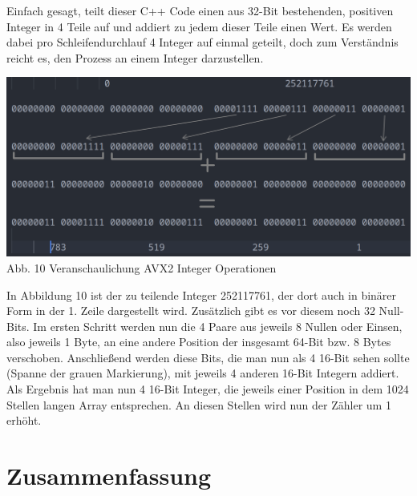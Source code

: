 \documentclass[11pt,a4paper]{article}
\begin{document}
Einfach gesagt, teilt dieser C++ Code einen aus 32-Bit bestehenden, positiven Integer in 4 Teile auf und addiert
zu jedem dieser Teile einen Wert. Es werden dabei pro Schleifendurchlauf 4 Integer auf einmal geteilt, doch zum Verständnis reicht es,
den Prozess an einem Integer darzustellen.

\begin{center}
    \includegraphics[width=1\textwidth]{./diagramme/matplotlib/avx2explanationfull.png}
    Abb. 10 Veranschaulichung AVX2 Integer Operationen
\end{center}

In Abbildung 10 ist der zu teilende Integer 252117761, der dort auch in binärer Form in der 1. Zeile
dargestellt wird. Zusätzlich gibt es vor diesem noch 32 Null-Bits. Im ersten Schritt werden nun die 4
Paare aus jeweils 8 Nullen oder Einsen, also jeweils 1 Byte, an eine andere Position der insgesamt 64-Bit bzw. 8
Bytes verschoben. Anschließend werden diese Bits, die man nun als 4 16-Bit sehen sollte (Spanne der grauen Markierung),
mit jeweils 4 anderen 16-Bit Integern addiert. Als Ergebnis hat man nun 4 16-Bit Integer, die
jeweils einer Position in dem 1024 Stellen langen Array entsprechen. An diesen Stellen wird nun der Zähler
um 1 erhöht.

\clearpage

\section{Zusammenfassung}
\end{document}
